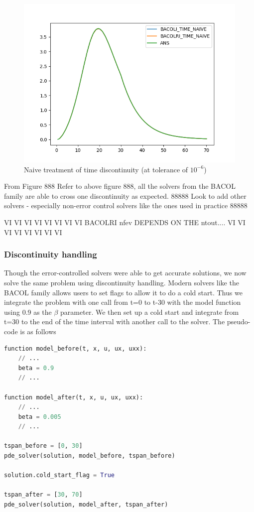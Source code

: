 \documentclass{article}
\begin{document}
\begin{figure}[H]
\centering
\includegraphics[width=0.7\linewidth]{./figures/pde_time_disc_naive}
\caption{Naive treatment of time discontinuity (at tolerance of $10^{-6}$)}
\label{fig:pde_time_disc_naive}
\end{figure}

From Figure 888 Refer to above figure 888, all the solvers from the BACOL family are able to cross one discontinuity as expected. 
88888 Look to add other solvers - especially non-error control solvers like the ones used in practice 88888


VI VI VI VI VI VI VI VI
BACOLRI nfev DEPENDS ON THE ntout....
VI VI VI VI VI VI VI VI


\subsubsection{Discontinuity handling}
Though the error-controlled solvers were able to get accurate solutions, we now solve the same problem using discontinuity handling. Modern solvers like the BACOL family allows users to set flags to allow it to do a cold start. Thus we integrate the problem with one call from t=0 to t-30 with the model function using 0.9 as the $\beta$ parameter. We then set up a cold start and integrate from t=30 to the end of the time interval with another call to the solver. The pseudo-code is as follows

\begin{minipage}{\linewidth}
\begin{lstlisting}[language=Python]
function model_before(t, x, u, ux, uxx):
    // ...
    beta = 0.9
    // ...
    
function model_after(t, x, u, ux, uxx):
    // ...
    beta = 0.005
    // ...
 
tspan_before = [0, 30]
pde_solver(solution, model_before, tspan_before)

solution.cold_start_flag = True

tspan_after = [30, 70]
pde_solver(solution, model_after, tspan_after)

\end{lstlisting}
\end{minipage}
\end{document}

